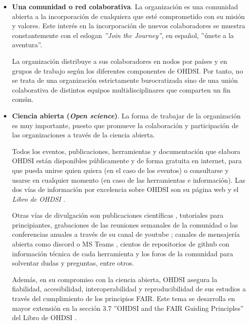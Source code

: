 \begin{itemize}

    \item \textbf{Una comunidad o red colaborativa}. La organización es una comunidad abierta a la incorporación de cualquiera que esté comprometido con su misión y valores. Este interés en la incorporación de nuevos colaboradores se muestra constantemente con el eslogan \textit{''Join the Journey''}, en español, ''únete a la aventura''.
    
    La organización distribuye a sus colaboradores en nodos por países y en grupos de trabajo según los diferentes componentes de OHDSI. Por tanto, no se trata de una organización estrictamente burocratizada sino de una unión colaborativa de distintos equipos multidisciplinares que comparten un fin común.

    \item \textbf{Ciencia abierta (\textit{Open science})}. La forma de trabajar de la organización es muy importante, puesto que promueve la colaboración y participación de las organizaciones a través de la ciencia abierta.

    Todos los eventos, publicaciones, herramientas y documentación que elabora OHDSI están disponibles públicamente y de forma gratuita en internet, para que pueda unirse quien quiera (en el caso de los eventos) o consultarse y usarse en cualquier momento (en caso de las herramientas e información). Las dos vías de información por excelencia sobre OHDSI son su página web \parencite{OHDSIwebsite} y el \textit{Libro de OHDSI} \parencite{OHDSIbook}. 
    
    Otras vías de divulgación son publicaciones científicas \parencite{OHDSIpublications}, tutoriales para principiantes, grabaciones de las reuniones semanales de la comunidad o las conferencias anuales a través de su canal de youtube \parencite{OHDSIyt}; canales de mensajería abierta como discord \parencite{OHDSIdiscordInvitation} o MS Teams \parencite{OHDSIofficeForm}, cientos de repositorios de github con información técnica de cada herramienta \parencite{OHDSIgithub} y los foros de la comunidad \parencite{OHDSIforums} para solventar dudas y preguntas, entre otros.

    Además, en su compromiso con la ciencia abierta, OHDSI asegura la fiabilidad, accesibilidad, interoperabilidad y reproducibilidad de sus estudios a través del cumplimiento de los principios FAIR. Este tema se desarrolla en mayor extensión en la sección 3.7 ''OHDSI and the FAIR Guiding Principles'' del Libro de OHDSI \parencite{OHDSIbook}.


\end{itemize}
